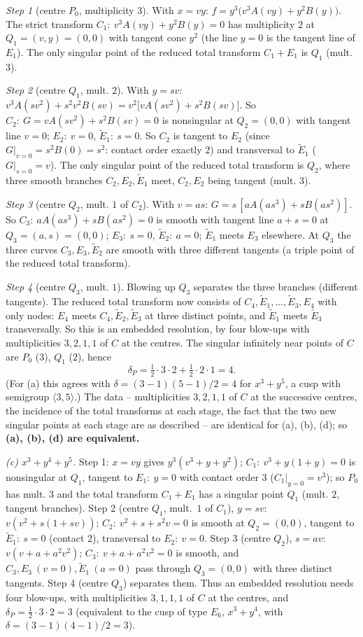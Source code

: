 \documentclass[11pt]{article}
\begin{document}
\emph{Step 1} (centre $P_0$, multiplicity $3$). With $x=vy$: $f=y^3\bigl(v^3A(vy)+y^2B(y)\bigr)$. The strict transform $C_1:\ v^3A(vy)+y^2B(y)=0$ has multiplicity $2$ at $Q_1=(v,y)=(0,0)$ with tangent cone $y^2$ (the line $y=0$ is the tangent line of $E_1$). The only singular point of the reduced total transform $C_1+E_1$ is $Q_1$ (mult. $3$).

\emph{Step 2} (centre $Q_1$, mult. $2$). With $y=sv$: $v^3A(sv^2)+s^2v^2B(sv)=v^2\bigl[vA(sv^2)+s^2B(sv)\bigr]$. So $C_2:\ G=vA(sv^2)+s^2B(sv)=0$ is nonsingular at $Q_2=(0,0)$ with tangent line $v=0$; $E_2:\ v=0$, $\widetilde E_1:\ s=0$. So $C_2$ is tangent to $E_2$ (since $G|_{v=0}=s^2B(0)=s^2$: contact order exactly $2$) and transversal to $\widetilde E_1$ ($G|_{s=0}=v$). The only singular point of the reduced total transform is $Q_2$, where three smooth branches $C_2,E_2,\widetilde E_1$ meet, $C_2,E_2$ being tangent (mult. $3$).

\emph{Step 3} (centre $Q_2$, mult. $1$ of $C_2$). With $v=as$: $G=s\,[aA(as^3)+sB(as^2)]$. So $C_3:\ aA(as^3)+sB(as^2)=0$ is smooth with tangent line $a+s=0$ at $Q_3=(a,s)=(0,0)$; $E_3:\ s=0$, $\widetilde E_2:\ a=0$; $\widetilde E_1$ meets $E_3$ elsewhere. At $Q_3$ the three curves $C_3,E_3,\widetilde E_2$ are smooth with three different tangents (a triple point of the reduced total transform).

\emph{Step 4} (centre $Q_3$, mult. $1$). Blowing up $Q_3$ separates the three branches (different tangents). The reduced total transform now consists of $C_4,\widetilde E_1,\dots,\widetilde E_3,E_4$ with only nodes: $E_4$ meets $C_4,\widetilde E_2,\widetilde E_3$ at three distinct points, and $\widetilde E_1$ meets $\widetilde E_3$ transversally. So this is an embedded resolution, by four blow-ups with multiplicities $3,2,1,1$ of $C$ at the centres. The singular infinitely near points of $C$ are $P_0$ ($3$), $Q_1$ ($2$), hence
\[
\delta_P=\tfrac12\cdot3\cdot2+\tfrac12\cdot2\cdot1=4 .
\]
(For (a) this agrees with $\delta=(3-1)(5-1)/2=4$ for $x^3+y^5$, a cusp with semigroup $\langle3,5\rangle$.) The data -- multiplicities $3,2,1,1$ of $C$ at the successive centres, the incidence of the total transforms at each stage, the fact that the two new singular points at each stage are as described -- are identical for (a), (b), (d); so \textbf{(a), (b), (d) are equivalent.}

\emph{(c) $x^3+y^4+y^5$.} Step 1: $x=vy$ gives $y^3(v^3+y+y^2)$; $C_1:\ v^3+y(1+y)=0$ is nonsingular at $Q_1$, tangent to $E_1:\ y=0$ with contact order $3$ ($C_1|_{y=0}=v^3$); so $P_0$ has mult. $3$ and the total transform $C_1+E_1$ has a singular point $Q_1$ (mult. $2$, tangent branches). Step 2 (centre $Q_1$, mult.\ $1$ of $C_1$), $y=sv$: $v(v^2+s(1+sv))$; $C_2:\ v^2+s+s^2v=0$ is smooth at $Q_2=(0,0)$, tangent to $\widetilde E_1:\ s=0$ (contact $2$), transversal to $E_2:\ v=0$. Step 3 (centre $Q_2$), $s=av$: $v(v+a+a^2v^2)$; $C_3:\ v+a+a^2v^2=0$ is smooth, and $C_3,E_3\ (v=0),\widetilde E_1\ (a=0)$ pass through $Q_3=(0,0)$ with three distinct tangents. Step 4 (centre $Q_3$) separates them. Thus an embedded resolution needs four blow-ups, with multiplicities $3,1,1,1$ of $C$ at the centres, and $\delta_P=\tfrac12\cdot3\cdot2=3$ (equivalent to the cusp of type $E_6$, $x^3+y^4$, with $\delta=(3-1)(4-1)/2=3$).
\end{document}
